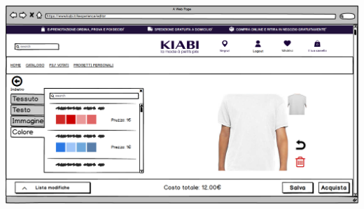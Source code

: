 \documentclass[12pt,italian,]{report}
\begin{document}
\\
\\
\includegraphics{balsamiq/Editor - caratteristica busto colore.png}
\end{document}
